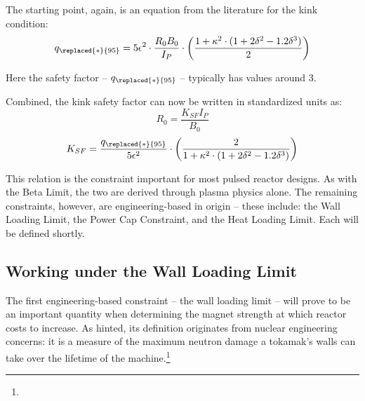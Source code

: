 The starting point, again, is an equation from the literature for the kink condition: \cite{process,oldpaper} 
\begin{equation}
	q_{\replaced{*}{95}} = 5 \epsilon^2 \cdot  \frac{ R_0 B_0 }{ I_P } \cdot \left( \frac{1 + \kappa^2 \cdot ( 1 + 2 \delta^2 - 1.2 \delta^3 ) }{2} \right)
\end{equation}

Here the safety factor -- $q_{\replaced{*}{95}}$ --  typically has values around 3. 

Combined, the kink safety factor can now be written in standardized units as:
\begin{equation}
	\label{eq:r_kink}
   R_0 = \frac{ K_{SF} I_P }{ B_0 }
\end{equation}
\begin{equation}
  K_{SF} = \frac{q_{\replaced{*}{95}}}{5 \epsilon^2} \cdot \left( \frac{2}{1 + \kappa^2 \cdot ( 1 + 2 \delta^2 - 1.2 \delta^3 ) } \right)
\end{equation}

This relation is the  constraint important for most pulsed reactor designs. As with the Beta Limit, the two are derived through plasma physics alone. The remaining  constraints, however, are engineering-based in origin -- these include: the Wall Loading Limit, the Power Cap Constraint, and the Heat Loading Limit. Each will be defined shortly.

\subsection{Working under the Wall Loading Limit}

\label{subsection:wall_loading}

The first engineering-based  constraint -- the wall loading limit -- will prove to be an important quantity when determining the magnet strength at which reactor costs  to increase. As hinted, its definition originates from nuclear engineering concerns: it is a measure of the maximum neutron damage a tokamak's walls can take over the lifetime of the machine.\footnote{}

